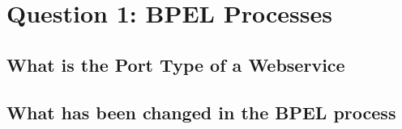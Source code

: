 \section{Question 1: BPEL Processes}

\subsection{What is the Port Type of a Webservice}

\subsection{What has been changed in the BPEL process}
